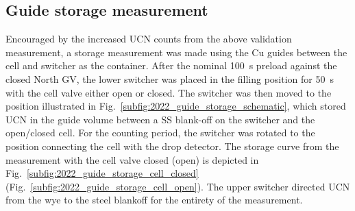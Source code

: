 
\subsection{Guide storage measurement}\label{sec:guide_storage_measurement}


Encouraged by the increased UCN counts from the above validation measurement, a storage measurement was made using the Cu guides between the cell and switcher as the container. After the nominal \qty{100}{s} preload against the closed North GV, the lower switcher was placed in the filling position for \qty{50}{s} with the cell valve either open or closed. The switcher was then moved to the position illustrated in Fig.~\ref{subfig:2022_guide_storage_schematic}, which stored UCN in the guide volume between a SS blank-off on the switcher and the open/closed cell. For the counting period, the switcher was rotated to the position connecting the cell with the drop detector. The storage curve from the measurement with the cell valve closed (open) is depicted in Fig.~\ref{subfig:2022_guide_storage_cell_closed} (Fig.~\ref{subfig:2022_guide_storage_cell_open}). The upper switcher directed UCN from the wye to the steel blankoff for the entirety of the measurement.



